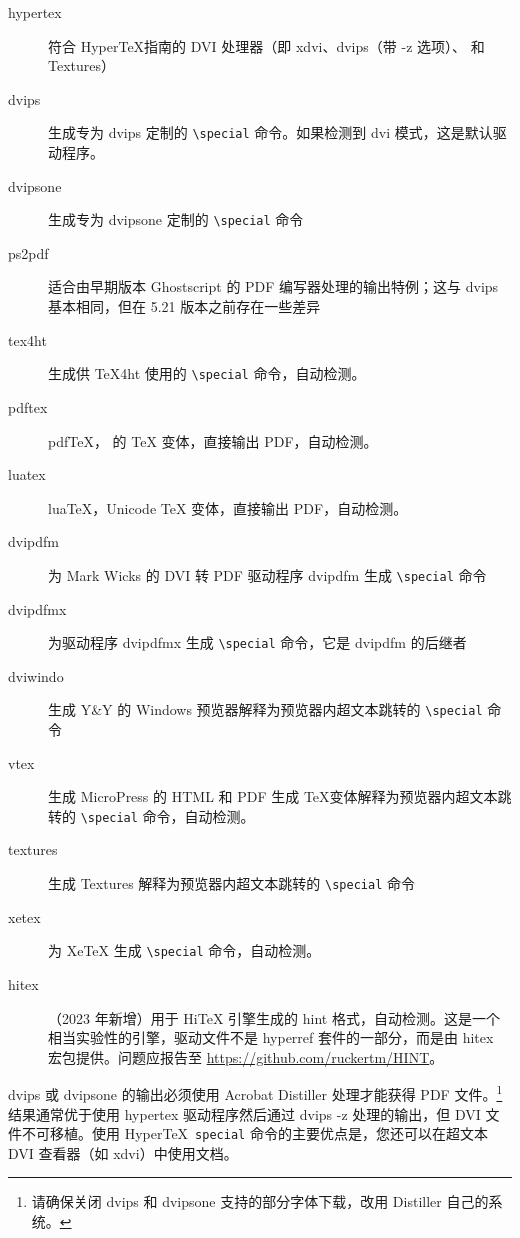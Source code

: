 \documentclass{article}
\newcommand*{\xpackage}[1]{\textsf{#1}}
\newcommand{\bs}{\symbol{'134}}%
\newcommand{\ci}[1]{\texttt{\bs#1}}
\begin{document}
\begin{description}
\item[hypertex] 符合 Hyper\TeX 指南的 DVI 处理器（即 \textsf{xdvi}、\textsf{dvips}（带 \textsf{-z} 选项）、\textsf{} 和 \textsf{Textures}）
\item[dvips] 生成专为 \textsf{dvips} 定制的 \verb|\special| 命令。如果检测到 dvi 模式，这是默认驱动程序。
\item[dvipsone] 生成专为 \textsf{dvipsone} 定制的 \verb|\special| 命令
\item[ps2pdf] 适合由早期版本 Ghost\-script 的 PDF 编写器处理的输出特例；这与 \textsf{dvips} 基本相同，但在 5.21 版本之前存在一些差异
\item[tex4ht] 生成供 \textsf{\TeX4ht} 使用的 \verb|\special| 命令，自动检测。
\item[pdftex] pdf\TeX， 的 \TeX{} 变体，直接输出 PDF，自动检测。
\item[luatex] lua\TeX，Unicode \TeX{} 变体，直接输出 PDF，自动检测。
\item[dvipdfm] 为 Mark Wicks 的 DVI 转 PDF 驱动程序 \textsf{dvipdfm} 生成 \verb|\special| 命令
\item[dvipdfmx] 为驱动程序 \textsf{dvipdfmx} 生成 \verb|\special| 命令，它是 \textsf{dvipdfm} 的后继者
\item[dviwindo] 生成 Y\&Y 的 Windows 预览器解释为预览器内超文本跳转的 \verb|\special| 命令
\item[vtex] 生成 MicroPress 的 HTML 和 PDF 生成 \TeX 变体解释为预览器内超文本跳转的 \verb|\special| 命令，自动检测。
\item[textures] 生成 \textsf{Textures} 解释为预览器内超文本跳转的 \verb|\special| 命令
\item[xetex] 为 Xe\TeX{} 生成 \verb|\special| 命令，自动检测。
\item[hitex]（2023 年新增）用于 Hi\TeX{} 引擎生成的 hint 格式，自动检测。这是一个相当实验性的引擎，驱动文件不是 \xpackage{hyperref} 套件的一部分，而是由 \xpackage{hitex} 宏包提供。问题应报告至 \url{https://github.com/ruckertm/HINT}。
\end{description}

\textsf{dvips} 或 \textsf{dvipsone} 的输出必须使用 Acrobat Distiller 处理才能获得 PDF 文件。\footnote{请确保关闭 \textsf{dvips} 和 \textsf{dvipsone} 支持的部分字体下载，改用 Distiller 自己的系统。}结果通常优于使用 \textsf{hypertex} 驱动程序然后通过 \textsf{dvips -z} 处理的输出，但 DVI 文件不可移植。使用 Hyper\TeX\ \ci{special} 命令的主要优点是，您还可以在超文本 DVI 查看器（如 \textsf{xdvi}）中使用文档。
\end{document}
